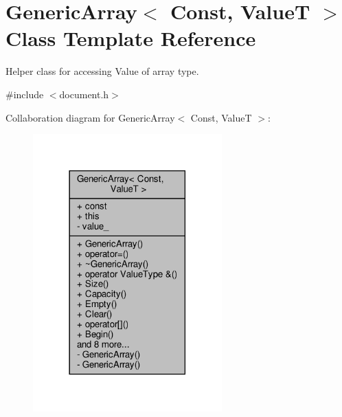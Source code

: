 \hypertarget{classGenericArray}{}\section{Generic\+Array$<$ Const, ValueT $>$ Class Template Reference}
\label{classGenericArray}


Helper class for accessing Value of array type.  




{\ttfamily \#include $<$document.\+h$>$}



Collaboration diagram for Generic\+Array$<$ Const, ValueT $>$\+:
\nopagebreak
\begin{figure}[H]
\begin{center}
\leavevmode
\includegraphics[width=206pt]{classGenericArray__coll__graph}
\end{center}
\end{figure}
